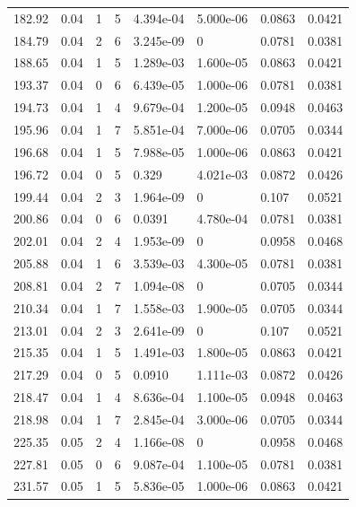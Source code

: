 \documentclass[preview]{standalone}
\begin{document}
{{{\begin{tabular}{L{1.2cm}C{1.2cm} C{0.3cm}C{0.5cm} C{1.4cm}C{1.4cm} C{1.4cm}C{1.4cm}}
  182.92  &  0.04  & 1     &  5 &  4.394e-04  & 5.000e-06  & 0.0863 &  0.0421   \\ 
  184.79  &  0.04  & 2     &  6 &  3.245e-09  & 0  & 0.0781 &  0.0381   \\ 
  188.65  &  0.04  & 1     &  5 &  1.289e-03  & 1.600e-05  & 0.0863 &  0.0421   \\ 
  193.37  &  0.04  & 0     &  6 &  6.439e-05  & 1.000e-06  & 0.0781 &  0.0381   \\ 
  194.73  &  0.04  & 1     &  4 &  9.679e-04  & 1.200e-05  & 0.0948 &  0.0463   \\ 
  195.96  &  0.04  & 1     &  7 &  5.851e-04  & 7.000e-06  & 0.0705 &  0.0344   \\ 
  196.68  &  0.04  & 1     &  5 &  7.988e-05  & 1.000e-06  & 0.0863 &  0.0421   \\ 
  196.72  &  0.04  & 0     &  5 &  0.329  & 4.021e-03  & 0.0872 &  0.0426   \\ 
  199.44  &  0.04  & 2     &  3 &  1.964e-09  & 0  & 0.107 &  0.0521   \\ 
  200.86  &  0.04  & 0     &  6 &  0.0391  & 4.780e-04  & 0.0781 &  0.0381   \\ 
  202.01  &  0.04  & 2     &  4 &  1.953e-09  & 0  & 0.0958 &  0.0468   \\ 
  205.88  &  0.04  & 1     &  6 &  3.539e-03  & 4.300e-05  & 0.0781 &  0.0381   \\ 
  208.81  &  0.04  & 2     &  7 &  1.094e-08  & 0  & 0.0705 &  0.0344   \\ 
  210.34  &  0.04  & 1     &  7 &  1.558e-03  & 1.900e-05  & 0.0705 &  0.0344   \\ 
  213.01  &  0.04  & 2     &  3 &  2.641e-09  & 0  & 0.107 &  0.0521   \\ 
  215.35  &  0.04  & 1     &  5 &  1.491e-03  & 1.800e-05  & 0.0863 &  0.0421   \\ 
  217.29  &  0.04  & 0     &  5 &  0.0910  & 1.111e-03  & 0.0872 &  0.0426   \\ 
  218.47  &  0.04  & 1     &  4 &  8.636e-04  & 1.100e-05  & 0.0948 &  0.0463   \\ 
  218.98  &  0.04  & 1     &  7 &  2.845e-04  & 3.000e-06  & 0.0705 &  0.0344   \\ 
  225.35  &  0.05  & 2     &  4 &  1.166e-08  & 0  & 0.0958 &  0.0468   \\ 
  227.81  &  0.05  & 0     &  6 &  9.087e-04  & 1.100e-05  & 0.0781 &  0.0381   \\ 
  231.57  &  0.05  & 1     &  5 &  5.836e-05  & 1.000e-06  & 0.0863 &  0.0421   \\ 

\end{tabular}}}}
\end{document}
